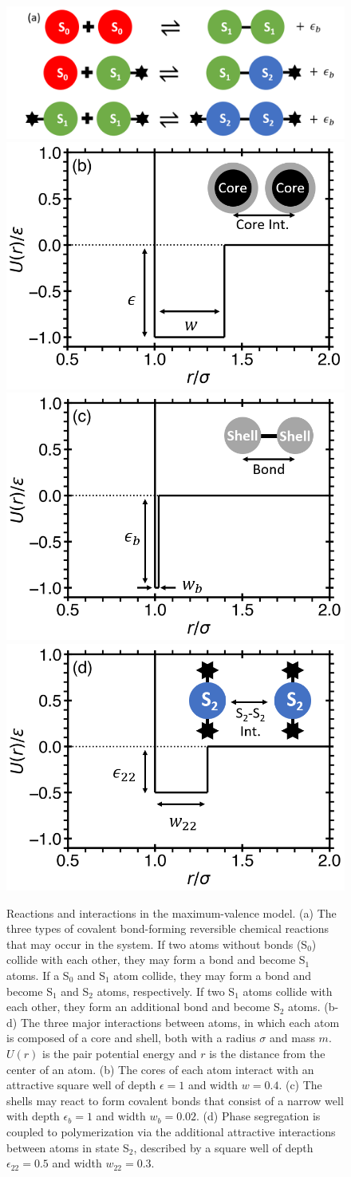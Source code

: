 \documentclass[9pt,twocolumn,twoside,lineno]{pnas-new}
\begin{document}

\begin{figure}[t]
\centering
{
\includegraphics[width=.7\textwidth]{scheme_03.png}
}
\includegraphics[width=0.32\linewidth]{IntFig1a.png}
\includegraphics[width=0.32\linewidth]{IntFig1b.png}
\includegraphics[width=0.32\linewidth]{IntFig1c.png}
\caption{Reactions and interactions in the maximum-valence model. (a) The three types of covalent bond-forming reversible chemical reactions that may occur in the system. If two atoms without bonds (S$_0$) collide with each other, they may form a bond and become S$_1$ atoms. If a S$_0$ and S$_1$ atom collide, they may form a bond and become S$_1$ and S$_2$ atoms, respectively. If two S$_1$ atoms collide with each other, they form an additional bond and become S$_2$ atoms. (b-d) The three major interactions between atoms, in which each atom is composed of a core and shell, both with a radius $\sigma$ and mass $m$. $U(r)$ is the pair potential energy and $r$ is the distance from the center of an atom. (b) The cores of each atom interact with an attractive square well of depth $\epsilon=1$ and width $w=0.4$. (c) The shells may react to form covalent bonds that consist of a narrow well with depth $\epsilon_{b} = 1$ and width $w_{b}=0.02$. (d) Phase segregation is coupled to polymerization via the additional attractive interactions between atoms in state S$_2$, described by a square well of depth $\epsilon_{22} = 0.5$ and width $w_{22}=0.3$.
}
\label{fig1}
\end{figure}
\end{document}
